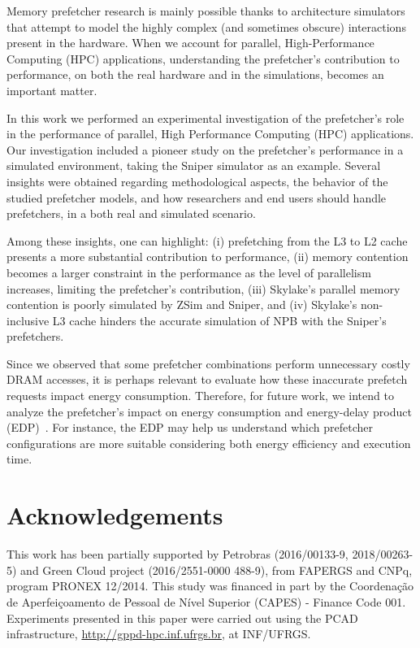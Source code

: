\documentclass[AMA,final,STIX1COL]{WileyNJD-v2}
\begin{document}
Memory prefetcher research is mainly possible thanks to architecture simulators that attempt to model the highly complex (and sometimes obscure) interactions present in the hardware. When we account for parallel, High-Performance Computing (HPC) applications, understanding the prefetcher's contribution to performance, on both the real hardware and in the simulations, becomes an important matter. 

In this work we performed an experimental investigation of the prefetcher's role in the performance of parallel, High Performance Computing (HPC) applications. Our investigation included a pioneer study on the prefetcher's performance in a simulated environment, taking the Sniper simulator as an example. Several insights were obtained regarding methodological aspects, the behavior of the studied prefetcher models, and how researchers and end users should handle prefetchers, in a both real and simulated scenario. 


Among these insights, one can highlight: (i) prefetching from the L3 to L2 cache presents a more substantial contribution to performance, (ii) memory contention becomes a larger constraint in the performance as the level of parallelism increases, limiting the prefetcher's contribution, (iii) Skylake's parallel memory contention is poorly simulated by ZSim and Sniper, and (iv) Skylake's non-inclusive L3 cache hinders the accurate simulation of NPB with the Sniper's prefetchers.

Since we observed that some prefetcher combinations perform unnecessary costly DRAM accesses, it is perhaps relevant to evaluate how these inaccurate prefetch requests impact energy consumption. Therefore, for future work, we intend to analyze the prefetcher's impact on energy consumption and energy-delay product (EDP)~\cite{gonzalez1996edp}. For instance, the EDP may help us understand which prefetcher configurations are more suitable considering both energy efficiency and execution time.



\section*{Acknowledgements}
This work has been partially supported by Petrobras (2016/00133-9, 2018/00263-5) and Green Cloud project (2016/2551-0000 488-9), from FAPERGS and CNPq, program PRONEX 12/2014. This study was financed in part by the Coordenação de Aperfeiçoamento de Pessoal de Nível Superior (CAPES) - Finance Code 001. Experiments presented in this paper were carried out using the PCAD infrastructure, \url{http://gppd-hpc.inf.ufrgs.br}, at INF/UFRGS.


\end{document}
